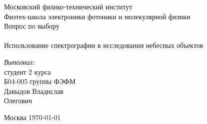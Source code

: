 \begin{titlepage}
\begin{center} 
 
\large Московский физико-технический институт\\
Физтех-школа электроники фотоники и молекулярной физики\\
\vspace{6cm}
\huge Вопрос по выбору \\\ \\ Использование спектрографии в исследовании небесных объектов
\end{center} 

\vspace{7cm}
{\par \raggedleft \large \emph{Выполнил:}\\ студент 2 курса\\ Б04-005 группы ФЭФМ\\ Давыдов Владислав\\ Олегович \par}
\begin{center}
\vfill Москва \today
\end{center}
\end{titlepage}
\newpage
\setcounter{page}{2}